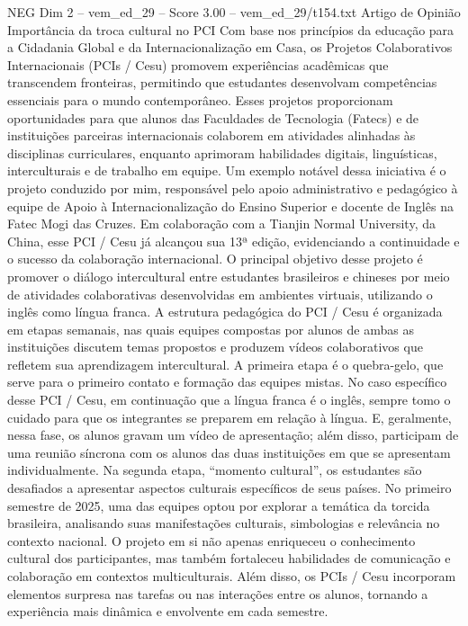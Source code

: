 \begin{textsample}{NEG Dim 2 – vem\_ed\_29 – Score 3.00 – vem\_ed\_29/t154.txt}  \label{ex:f2_neg_061}
Artigo de Opinião Importância da troca cultural no PCI Com base nos princípios da educação para a Cidadania Global e da Internacionalização em Casa, os Projetos Colaborativos Internacionais (PCIs / Cesu) promovem experiências acadêmicas que transcendem fronteiras, permitindo que estudantes desenvolvam competências essenciais para o mundo contemporâneo.
Esses projetos proporcionam oportunidades para que alunos das Faculdades de Tecnologia (Fatecs) e de instituições parceiras internacionais colaborem em atividades alinhadas às disciplinas curriculares, enquanto aprimoram habilidades digitais, linguísticas, interculturais e de trabalho em equipe.
Um exemplo notável dessa iniciativa é o projeto conduzido por mim, responsável pelo apoio administrativo e pedagógico à equipe de Apoio à Internacionalização do Ensino Superior e docente de Inglês na Fatec Mogi das Cruzes.
Em colaboração com a Tianjin Normal University, da China, esse PCI / Cesu já alcançou sua 13ª edição, evidenciando a continuidade e o sucesso da colaboração internacional.
O principal objetivo desse projeto é promover o diálogo intercultural entre estudantes brasileiros e chineses por meio de atividades colaborativas desenvolvidas em ambientes virtuais, utilizando o inglês como língua franca.
A estrutura pedagógica do PCI / Cesu é organizada em etapas semanais, nas quais equipes compostas por alunos de ambas as instituições discutem temas propostos e produzem vídeos colaborativos que refletem sua aprendizagem intercultural.
A primeira etapa é o quebra-gelo, que serve para o primeiro contato e formação das equipes mistas.
No caso específico desse PCI / Cesu, em continuação que a língua franca é o inglês, sempre tomo o cuidado para que os integrantes se preparem em relação à língua.
E, geralmente, nessa fase, os alunos gravam um vídeo de apresentação; além disso, participam de uma reunião síncrona com os alunos das duas instituições em que se apresentam individualmente.
Na segunda etapa, “momento cultural”, os estudantes são desafiados a apresentar aspectos culturais específicos de seus países.
No primeiro semestre de 2025, uma das equipes optou por explorar a temática da torcida brasileira, analisando suas manifestações culturais, simbologias e relevância no contexto nacional.
O projeto em si não apenas enriqueceu o conhecimento cultural dos participantes, mas também fortaleceu habilidades de comunicação e colaboração em contextos multiculturais.
Além disso, os PCIs / Cesu incorporam elementos surpresa nas tarefas ou nas interações entre os alunos, tornando a experiência mais dinâmica e envolvente em cada semestre.

\end{textsample}
